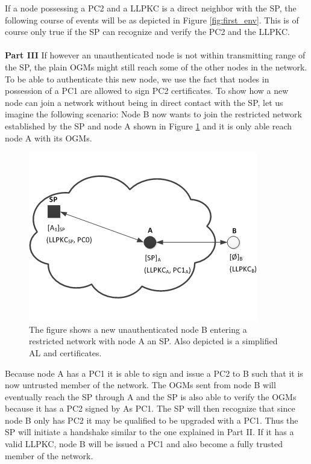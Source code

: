 \noindent
If a node possessing a PC2 and a LLPKC is a direct neighbor with the SP, the following course of events will be as depicted in  Figure \ref{fig:first_env}. This is of course only true if the SP can recognize and verify the PC2 and the LLPKC.
\\\\
\textbf{Part III} If however an unauthenticated node is not within transmitting range of the SP, the plain OGMs might still reach some of the other nodes in the network. To be able to authenticate this new node, we use the fact that nodes in possession of a PC1 are allowed to sign PC2 certificates. To show how a new node can join a network without being in direct contact with the SP, let us imagine the following scenario: Node B now wants to join the restricted network established by the SP and node A shown in Figure \ref{fig:simple_sec_env_1} and it is only able reach node A with its OGMs.
\\
\begin{figure}[ht]
	\centering
		\includegraphics{images/simple_sec_env_1.png}
	\caption{The figure shows a new unauthenticated node B entering a restricted network with node A an SP. Also depicted is a simplified AL and certificates.}
	\label{fig:simple_sec_env_1}
\end{figure}

\noindent
Because node A has a PC1 it is able to sign and issue a PC2 to B such that it is now untrusted member of the network. The OGMs sent from node B will eventually reach the SP through A and the SP is also able to verify the OGMs because it has a PC2 signed by As PC1. The SP will then recognize that since node B only has PC2 it may be qualified to be upgraded with a PC1. Thus the SP will initiate a handshake similar to the one explained in Part II. If it has a valid LLPKC, node B will be issued a PC1 and also become a fully trusted member of the network.


